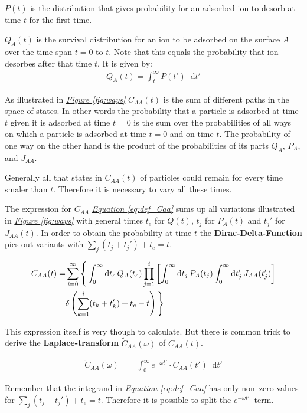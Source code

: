\documentclass[a4paper, parskip=half]{scrartcl}
\newcommand{\effect}[1]{%
	\textbf{#1}%
}
\newcommand{\diff}{\mathop{}\!\mathrm{d}}
\newcommand{\myFigRef}[1]{\textit{\hyperref[#1]{Figure \ref*{#1}}}}
\newcommand{\myEqRef}[1]{\textit{\hyperref[eq:#1]{Equation \ref*{eq:#1}}}}
\newcommand{\myEqLabel}[1]{\label{eq:#1}}
\begin{document}
$P(t)$ is the distribution that gives probability for an adsorbed ion to desorb at time $t$ for the first time.

$Q_A(t)$ is the survival distribution for an ion to be adsorbed on the surface $A$ over the time span $t=0$ to $t$. Note that this equals the probability that ion desorbes after that time $t$. It is given by:
\begin{align}
Q_A(t) = \int_t^\infty P(t') \diff t'
\end{align}

As illustrated in \myFigRef{fig:ways} $C_{AA}(t)$ is the sum of different paths in the space of states. In other words the probability that a particle is adsorbed at time $t$ given it is adsorbed at time $t=0$ is the sum over the probabilities of all ways on which a particle is adsorbed at time $t=0$ and on time $t$. The probability of one way on the other hand is the product of the probabilities of its parts $Q_A$, $P_A$, and $J_{AA}$.

Generally all that states in $C_{AA}(t)$ of particles could remain for every time smaler than $t$. Therefore it is necessary to vary all these times. 

The expression for $C_{AA}$ \myEqRef{def_Caa}  sums up all variations illustrated in \myFigRef{fig:ways} with general times $t_e$ for $Q(t)$, $t_j$ for $P_A(t)$ and $t_j'$ for $J_{AA}(t)$. In order to obtain the probability at time $t$ the \effect{Dirac-Delta-Function} pics out variants with $\sum_{j} (t_j+t_j') + t_e = t$.

\begin{align}
C_{AA}(t) = &\sum_{i=0}^\infty \Bigg\lbrace \int_0^\infty \diff t_e\, Q_A(t_e) \prod_{j=1}^i \left[ \int_0^\infty \diff t_j\, P_A(t_j) \int_0^\infty \diff t_j'\, J_{AA}(t_j')\right]\notag\\ 
&\delta \left(\sum_{k=1}^i(t_k+t_k') + t_e - t \right) \Bigg\rbrace \myEqLabel{def_Caa}
\end{align}

This expression itself is very though to calculate. But there is common trick to derive the \effect{Laplace-transform} $\widetilde{C}_{AA}(\omega)$ of $C_{AA}(t)$.

\begin{align}
\widetilde{C}_{AA}(\omega) &= \int_0^\infty e^{-\omega t'} \cdot C_{AA}(t') \diff t'
\end{align}

Remember that the integrand in \myEqRef{def_Caa} has only non--zero values for $\sum_{j} (t_j+t_j') + t_e = t$. Therefore it is possible to split the $e^{-\omega t'}$--term.
\end{document}
